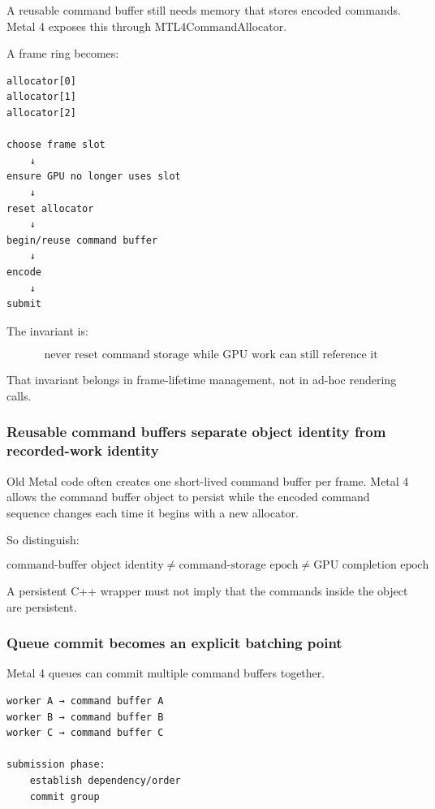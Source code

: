 A reusable command buffer still needs memory that stores encoded commands. Metal 4 exposes this through MTL4CommandAllocator.

A frame ring becomes:

\begin{verbatim}
allocator[0]
allocator[1]
allocator[2]

choose frame slot
    ↓
ensure GPU no longer uses slot
    ↓
reset allocator
    ↓
begin/reuse command buffer
    ↓
encode
    ↓
submit
\end{verbatim}

The invariant is:

\[
\boxed{
\text{never reset command storage while GPU work can still reference it}
}
\]

That invariant belongs in frame-lifetime management, not in ad-hoc rendering calls.

\subsubsection{Reusable command buffers separate object identity from recorded-work identity}\label{05-engine-i-ch022-reusable-command-buffers-separate-object-identity-from-recorded-work-identity}

Old Metal code often creates one short-lived command buffer per frame. Metal 4 allows the command buffer object to persist while the encoded command sequence changes each time it begins with a new allocator.

So distinguish:

\[
\boxed{
\text{command-buffer object identity}
\neq
\text{command-storage epoch}
\neq
\text{GPU completion epoch}
}
\]

A persistent C++ wrapper must not imply that the commands inside the object are persistent.

\subsubsection{Queue commit becomes an explicit batching point}\label{05-engine-i-ch022-queue-commit-becomes-an-explicit-batching-point}

Metal 4 queues can commit multiple command buffers together.

\begin{verbatim}
worker A → command buffer A
worker B → command buffer B
worker C → command buffer C

submission phase:
    establish dependency/order
    commit group
\end{verbatim}

